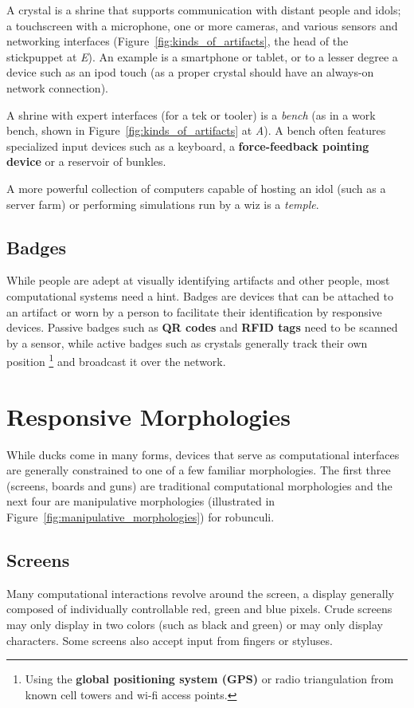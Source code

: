 A crystal is a shrine that supports communication with distant people and idols; a touchscreen with a microphone, one or more cameras, and various sensors and networking interfaces (Figure~\ref{fig:kinds_of_artifacts}, the head of the stickpuppet at \emph{E}). An example is a smartphone or tablet, or to a lesser degree a device such as an ipod touch (as a proper crystal should have an always-on network connection). 

A shrine with expert interfaces (for a tek or tooler) is a \emph{bench} (as in a work bench, shown in Figure~\ref{fig:kinds_of_artifacts} at \emph{A}). A bench often features specialized input devices such as a keyboard, a \textbf{force-feedback pointing device} or a reservoir of bunkles. 

A more powerful collection of computers capable of hosting an idol (such as a server farm) or performing simulations run by a wiz is a \emph{temple}.

\subsection{Badges}
%
While people are adept at visually identifying artifacts and other people, most computational systems need a hint. Badges are devices that can be attached to an artifact or worn by a person to facilitate their identification by responsive devices. Passive badges such as \textbf{QR codes} and \textbf{RFID tags} need to be scanned by a sensor, while active badges such as crystals generally track their own position%
\footnote{Using the \textbf{global positioning system (GPS)} or radio triangulation from known cell towers and wi-fi access points.}
and broadcast it over the network.


\section{Responsive Morphologies}
\label{sec:morphologies}
%
While ducks come in many forms, devices that serve as computational interfaces are generally constrained to one of a few familiar morphologies. The first three (screens, boards and guns) are traditional computational morphologies and the next four are manipulative morphologies (illustrated in Figure~\ref{fig:manipulative_morphologies}) for robunculi.

\subsection{Screens}
%
Many computational interactions revolve around the screen, a display generally composed of individually controllable red, green and blue pixels. Crude screens may only display in two colors (such as black and green) or may only display characters. Some screens also accept input from fingers or styluses.

